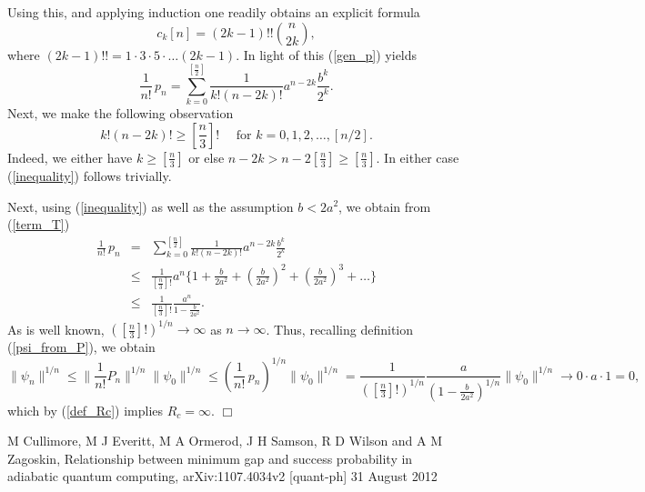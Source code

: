 \documentclass[11 pt]{article}
\begin{document}
Using this, and applying induction one readily obtains an explicit formula 
\begin{equation}\label{c_formula}
c_k[n] = (2k-1)!!  {n\choose{2k}},
\end{equation}
where $(2k-1)!! = 1\cdot3\cdot 5\cdot \ldots (2k-1)$.
In light of this (\ref{gen_p}) yields
\begin{equation}\label{term_T}
\frac{1}{n!} \, p_n = \sum\limits_{k=0}^{[\frac{n}{2}]}\frac{1}{k!(n-2k)!} a^{n-2k}\frac{b^k}{2^k} .
\end{equation}
  Next, we make the following observation
 \begin{equation}\label{inequality}
 k! (n-2k)! \geq \left[\frac{n}{3}\right]!\quad \mbox{ for } k = 0,1,2,\ldots , [n/2] .
 \end{equation}
 Indeed, we either have $k\geq \left[\frac{n}{3}\right]$ or else $n-2k > n -2 \left[\frac{n}{3}\right] \geq \left[\frac{n}{3}\right] $. In either case (\ref{inequality}) follows trivially. 
 
 Next, using (\ref{inequality}) as well as the assumption $b< 2a^2$, we obtain from (\ref{term_T})
 \begin{equation}\label{term_T_est}
 \begin{array}{lll}
 \frac{1}{n!} \, p_n &=& \sum\limits_{k=0}^{[\frac{n}{2}]}\frac{1}{k!(n-2k)!} a^{n-2k}\frac{b^k}{2^k} \\
 & \leq & \frac{1}{\left[\frac{n}{3}\right]!}a^n\{1 + \frac{b}{2a^2} + \left(\frac{b}{2a^2}\right)^2  + \left(\frac{b}{2a^2}\right)^3 +\ldots\} \\
 & \leq & \frac{1}{\left[\frac{n}{3}\right]!} \frac{a^n}{1- \frac{b}{2a^2}}.
 \end{array}
\end{equation}
 As is well known, $\left(\left[\frac{n}{3}\right]!\right) ^{1/n} \rightarrow \infty$ as $n\rightarrow \infty$. Thus, recalling definition (\ref{psi_from_P}), we obtain
 \[
 \|\psi_n\|^{1/n} \leq \|\frac{1}{n!}P_n\|^{1/n} \|\psi_0\|^{1/n}\leq \left(\frac{1}{n!}\,p_n\right)^{1/n} \|\psi_0\|^{1/n} =
 \frac{1}{\left(\left[\frac{n}{3}\right]!\right)^{1/n}} \frac{a}{\left(1- \frac{b}{2a^2}\right)^{1/n}} \|\psi_0\|^{1/n}\rightarrow 0\cdot a\cdot 1 =0,
 \]
 which by (\ref{def_Rc}) implies $R_c = \infty$. $\Box$
 
 
 
 
 
 
 
 
 
 
 

\newpage
\begin{thebibliography}{[90]}

 M Cullimore, M J Everitt, M A Ormerod, J H Samson,
R D Wilson and A M Zagoskin, Relationship between minimum gap and success
probability in adiabatic quantum computing, arXiv:1107.4034v2 [quant-ph] 31 August 2012

\end{thebibliography}
\end{document}
